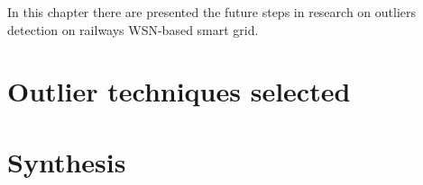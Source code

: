 In this chapter there are presented the future steps in research on outliers detection on railways WSN-based smart grid.


\section{Outlier techniques selected}

\lipsum[1]


\section{Synthesis}

\lipsum[1]
